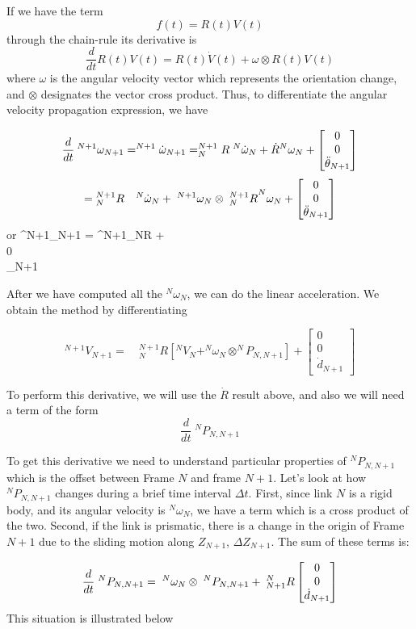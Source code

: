 If we have the term
\[
f(t) = R(t) V(t)
\]
through the chain-rule its derivative is
\[
\frac{d}{dt} R(t)V(t) = R(t)\dot V(t) + \omega \otimes R(t) V(t)
\]
where $\omega$ is the angular velocity vector which represents the orientation change, and $\otimes$ designates the vector cross product.   Thus, to differentiate the angular velocity propagation expression, we have

\[
\frac{d}{dt}\:
{^{N+1}\omega_{N+1}} =
^{N+1}\dot\omega_{N+1} = ^{N+1}_NR\;^N\dot{\omega}_N + \dot{R}^N\omega_N + \begin{bmatrix} 0\\0\\\ddot\theta_{N+1}\end{bmatrix}
\]
\[
= {^{N+1}_{N}R}\quad {^{N}\dot\omega_{N}} + \; {^{N+1}\omega_N}\otimes\;{^{N+1}_NR}^N\omega_N+ \begin{bmatrix} 0\\0\\\ddot\theta_{N+1}\end{bmatrix}
\]
or
\bq
^{N+1}\dot\omega_{N+1} = ^{N+1}_NR  +
\\0\\\ddot\theta_{N+1}\emat
\eq

After we have computed all the $^N\omega_N$, we can do the linear acceleration.  We obtain the method by differentiating

\[
^{N+1}V_{N+1} =\quad  {^{N+1}_{N}R}\left[
   ^{N}V_{N} +
   ^{N}\omega_{N} \otimes ^NP_{N,N+1}
   \right] +
\left[
\begin{array}{c}
0 \\
0 \\
\dot{d}_{N+1}
\end{array}
\right]
\]

To perform this derivative, we will use the $\dot{R}$ result above, and also we will need a term of the form
\[
\frac{d}{dt} \; {^NP_{N,N+1}}
\]

To get this derivative we need to understand particular properties of ${^NP_{N,N+1}}$ which is the offset between Frame $N$ and frame $N+1$.  Let's look at how ${^NP_{N,N+1}}$ changes during a brief time interval $\Delta t$.   First, since link $N$ is a rigid body, and its angular velocity is $^N\omega_N$, we have a term which is a cross product of the two.   Second, if the link is prismatic, there is a change in the origin of Frame $N+1$ due to the sliding motion along $Z_{N+1}$, $\Delta Z_{N+1}$.   The sum of these terms is:

\[
\frac{d}{dt} \; {^NP_{N,N+1}}  = \;{^N\omega_N}\otimes \;{^NP_{N,N+1}} + \;{^N_{N+1}R}\begin{bmatrix} 0\\0\\\dot{d}_{N+1}\end{bmatrix}
\]
This situation is illustrated below

